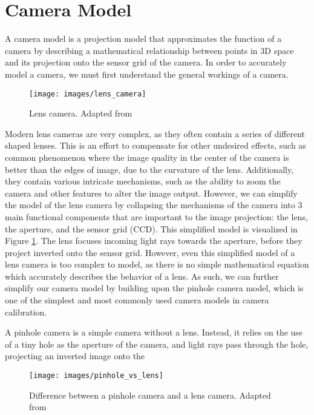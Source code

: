 \section{Camera Model}

A camera model is a projection model that approximates the function of a camera by describing a mathematical relationship between points in 3D space and its projection onto the sensor grid of the camera. In order to accurately model a camera, we must first understand the general workings of a camera.

\begin{figure}[h!]
    \centering
    \texttt{[image: images/lens\_camera]}
    \caption{Lens camera. Adapted from \cite{coltonPhysics1232012}} \label{fig:lens_camera}
\end{figure}


Modern lens cameras are very complex, as they often contain a series of different shaped lenses. This is an effort to compensate for other undesired effects, such as common phenomenon where the image quality in the center of the camera is better than the edges of image, due to the curvature of the lens. Additionally, they contain various intricate mechanisms, such as the ability to zoom the camera and other features to alter the image output. However, we can simplify the model of the lens camera by collapsing the mechanisms of the camera into 3 main functional components that are important to the image projection: the lens, the aperture, and the sensor grid (CCD). This simplified model is visualized in Figure \ref{fig:lens_camera}. The lens focuses incoming light rays towards the aperture, before they project inverted onto the sensor grid. However, even this simplified model of a lens camera is too complex to model, as there is no simple mathematical equation which accurately describes the behavior of a lens. As such, we can further simplify our camera model by building upon the pinhole camera model, which is one of the simplest and most commonly used camera models in camera calibration.

A pinhole camera is a simple camera without a lens. Instead, it relies on the use of a tiny hole as the aperture of the camera, and light rays pass through the hole, projecting an inverted image onto the

\begin{figure}[h!]
    \centering
    \texttt{[image: images/pinhole\_vs\_lens]}
    \caption{Difference between a pinhole camera and a lens camera. Adapted from \cite{leCameraModel2018}}
\end{figure}




